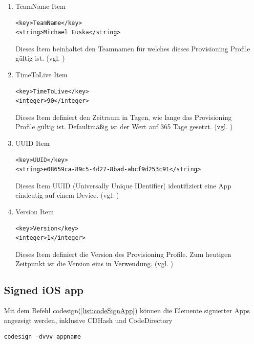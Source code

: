 \begin{enumerate}
    \item TeamName Item
\begin{lstlisting}[captionpos=b, caption={TeamName Item}]
<key>TeamName</key>
<string>Michael Fuska</string>
\end{lstlisting}
 Dieses Item beinhaltet den Teamnamen für welches dieses Provisioning Profile gültig ist. (vgl. \cite{iOSSec[5], Hacking[1]})

   \item TimeToLive Item
\begin{lstlisting}[captionpos=b, caption={TimeToLive Item}]
<key>TimeToLive</key>
<integer>90</integer>
\end{lstlisting}
Dieses Item definiert den Zeitraum in Tagen, wie lange das Provisioning Profile gültig ist. Defaultmäßig ist der Wert auf 365 Tage gesetzt. (vgl. \cite{iOSSec[5], Hacking[1]})
 
    \item UUID Item
\begin{lstlisting}[captionpos=b, caption={UUID Item}]
<key>UUID</key>
<string>e08659ca-89c5-4d27-8bad-abcf9d253c91</string>
\end{lstlisting}
Dieses Item UUID (Universally Unique IDentifier) identifiziert eine App eindeutig auf einem Device. (vgl. \cite{iOSSec[5], Hacking[1]})

    \item Version Item
\begin{lstlisting}[captionpos=b, caption={Version Item}]
<key>Version</key>
<integer>1</integer> 
\end{lstlisting}
Dieses Item definiert die Version des Provisioning Profile. Zum heutigen Zeitpunkt ist die Version eins in Verwendung. (vgl. \cite{iOSSec[5], Hacking[1]})
\end{enumerate}

\subsection{Signed iOS app}
\label{sec:SignediOSApp}
Mit dem Befehl \glqq codesign\grqq{}(\ref{list:codeSignApp}) können die Elemente signierter Apps angezeigt werden, inklusive CDHash und CodeDirectory
\newline

\begin{lstlisting}[captionpos=b, caption={Befehl: codesign}, label=list:codeSignApp]
    codesign -dvvv appname
\end{lstlisting}

